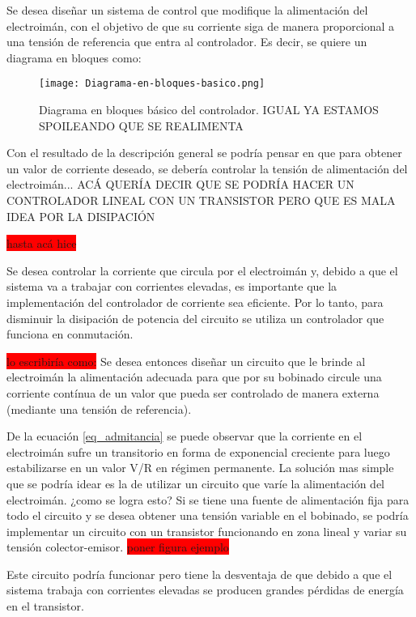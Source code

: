 Se desea diseñar un sistema de control que modifique la alimentación del electroimán, con el objetivo de que su corriente siga de manera proporcional a una tensión de referencia que entra al controlador. Es decir, se quiere un diagrama en bloques como: 

\begin{figure}[H]
	\centering
	\texttt{[image: Diagrama-en-bloques-basico.png]}
	\caption{Diagrama en bloques básico del controlador. IGUAL YA ESTAMOS SPOILEANDO QUE SE REALIMENTA}
	\label{fig:img_diagrama_bloques_basico}
\end{figure}

Con el resultado de la descripción general se podría pensar en que para obtener un valor de corriente deseado, se debería controlar la tensión de alimentación del electroimán... ACÁ QUERÍA DECIR QUE SE PODRÍA HACER UN CONTROLADOR LINEAL CON UN TRANSISTOR PERO QUE ES MALA IDEA POR LA DISIPACIÓN 

\colorbox{red}{hasta acá hice}

\noindent Se desea controlar la corriente que circula por el electroimán y, debido a que el sistema va a trabajar con corrientes elevadas, es importante que la implementación del controlador de corriente sea eficiente. Por lo tanto, para disminuir la disipación de potencia del circuito se utiliza un controlador que funciona en conmutación.

\colorbox{red}{lo escribiría como:}
Se desea entonces diseñar un circuito que le brinde al electroimán la alimentación adecuada para que por su bobinado circule una corriente contínua de un valor que pueda ser controlado de manera externa (mediante una tensión de referencia).

De la ecuación \ref{eq_admitancia} se puede observar que la corriente en el electroimán sufre un transitorio en forma de exponencial creciente para luego estabilizarse en un valor V/R en régimen permanente. La solución mas simple que se podría idear es la de utilizar un circuito que varíe la alimentación del electroimán. ¿como se logra esto? Si se tiene una fuente de alimentación fija para todo el circuito y se desea obtener una tensión variable en el bobinado, se podría implementar un circuito con un transistor funcionando en zona lineal y variar su tensión colector-emisor. \colorbox{red}{poner figura ejemplo}

Este circuito podría funcionar pero tiene la desventaja de que debido a que el sistema trabaja con corrientes elevadas se producen grandes pérdidas de energía en el transistor. 

